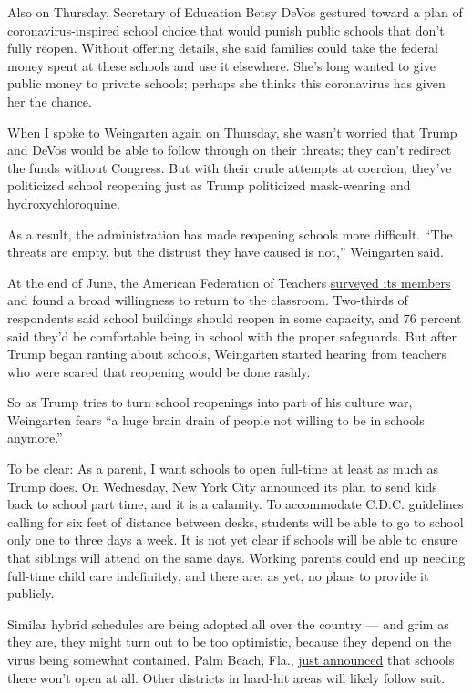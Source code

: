 Also on Thursday, Secretary of Education Betsy DeVos gestured toward a
plan of coronavirus-inspired school choice that would punish public
schools that don't fully reopen. Without offering details, she said
families could take the federal money spent at these schools and use it
elsewhere. She's long wanted to give public money to private schools;
perhaps she thinks this coronavirus has given her the chance.

When I spoke to Weingarten again on Thursday, she wasn't worried that
Trump and DeVos would be able to follow through on their threats; they
can't redirect the funds without Congress. But with their crude attempts
at coercion, they've politicized school reopening just as Trump
politicized mask-wearing and hydroxychloroquine.

As a result, the administration has made reopening schools more
difficult. ``The threats are empty, but the distrust they have caused is
not,'' Weingarten said.

At the end of June, the American Federation of Teachers
\href{https://www.aft.org/sites/default/files/june_2020_member_poll_slides_07072020.pdf}{surveyed
its members} and found a broad willingness to return to the classroom.
Two-thirds of respondents said school buildings should reopen in some
capacity, and 76 percent said they'd be comfortable being in school with
the proper safeguards. But after Trump began ranting about schools,
Weingarten started hearing from teachers who were scared that reopening
would be done rashly.

So as Trump tries to turn school reopenings into part of his culture
war, Weingarten fears ``a huge brain drain of people not willing to be
in schools anymore.''

To be clear: As a parent, I want schools to open full-time at least as
much as Trump does. On Wednesday, New York City announced its plan to
send kids back to school part time, and it is a calamity. To accommodate
C.D.C. guidelines calling for six feet of distance between desks,
students will be able to go to school only one to three days a week. It
is not yet clear if schools will be able to ensure that siblings will
attend on the same days. Working parents could end up needing full-time
child care indefinitely, and there are, as yet, no plans to provide it
publicly.

Similar hybrid schedules are being adopted all over the country --- and
grim as they are, they might turn out to be too optimistic, because they
depend on the virus being somewhat contained. Palm Beach, Fla.,
\href{https://www.palmbeachpost.com/news/20200708/pbc-school-campuses-will-remain-closed-to-students-board-members-decide}{just
announced} that schools there won't open at all. Other districts in
hard-hit areas will likely follow suit.

